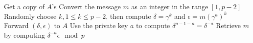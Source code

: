 \documentclass{subfiles}
\begin{document}
    \begin{procedure}
        \caption{ElGamal-Encode-Decode()}\label{proc:ElGamal-encode-decode}
        \nl Get a copy of $A$'s \DontPrintSemicolon\;
        \nl Convert the message \(m\) as an integer in the range $[1, p-2]$ \DontPrintSemicolon\;
        \nl Randomly choose $k, 1 \le k \le p - 2$, then compute $ \delta = \gamma^{k}$ and 
            $\epsilon = m (\gamma^{a})^{k}$ \DontPrintSemicolon\;
        \nl Forward $(\delta, \epsilon)$ to $A$\DontPrintSemicolon\;
        \nl Use the private key $a$ to compute $\delta^{p - 1 - a} = \delta^{-a}$ \DontPrintSemicolon\;
        \nl Retrieve $m$ by computing $\delta^{-a} \epsilon \mod p$
    \end{procedure}
\end{document}
